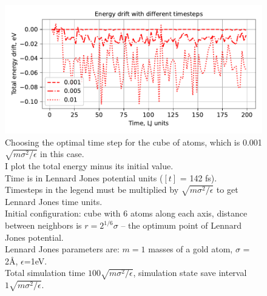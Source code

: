\documentclass[12pt,a4paper]{article}
\begin{document}
\begin{figure}[h!]
	\centering
	\includegraphics[width=.7\linewidth]{img/milestone05-total.pdf}
	\caption{Choosing the optimal time step for the cube of atoms, which is 0.001 $\sqrt{m\sigma^2 / \epsilon}$ in this case.\\
		I plot the total energy minus its initial value.\\
		Time is in Lennard Jones potential units ($[t]$ = 142 fs).\\
		Timesteps in the legend must be multiplied by $\sqrt{m\sigma^2 / \epsilon}$ to get Lennard Jones time units.\\
		Initial configuration: cube with 6 atoms along each axis, distance between neighbors is $r=2^{1/6}\sigma$ -- the optimum point of Lennard Jones potential.\\	
		Lennard Jones parameters are: $m=1$ masses of a gold atom, $\sigma$ = 2Å, $\epsilon$=1eV.\\
		Total simulation time \( 100 \sqrt{m\sigma^2 / \epsilon} \), simulation state save interval \( 1 \sqrt{m\sigma^2 / \epsilon} \).}
	\label{fig:total_energy_check}
\end{figure}
\end{document}
